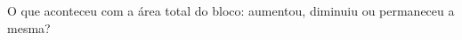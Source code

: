 \documentclass[a4paper,14pt]{article}
\begin{document}
\begin{multicols}{2}
\begin{enumerate}
\begin{center}
        	\end{center}
        	O que aconteceu com a área total do bloco: aumentou, diminuiu ou permaneceu a mesma?
   	    \end{enumerate}
       $~$ \\ $~$ \\ $~$ \\ $~$ \\ $~$ \\ $~$ \\ $~$ \\ $~$ \\ $~$ \\ $~$ \\ $~$ \\ $~$ \\ $~$ \\ $~$ \\ $~$ \\ $~$ \\ $~$ \\ $~$ \\  $~$ \\  $~$ \\ 
    \end{multicols}
\end{document}
